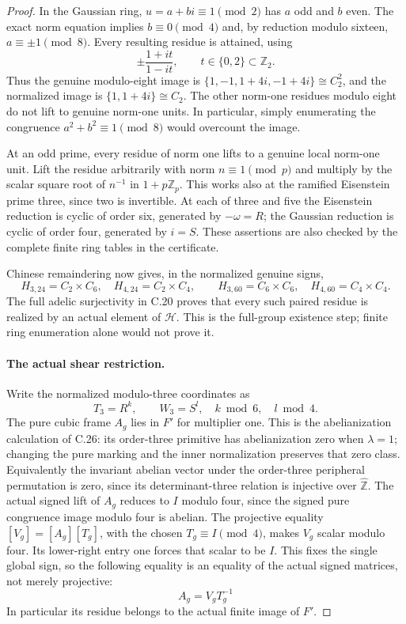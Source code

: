 \begin{proof}
In the Gaussian ring, $u=a+bi\equiv1\pmod2$ has $a$ odd and
$b$ even. The exact norm equation implies $b\equiv0\pmod4$ and,
by reduction modulo sixteen, $a\equiv\pm1\pmod8$.
Every resulting residue is attained, using
\[
 \pm\frac{1+it}{1-it},\qquad t\in\{0,2\}\subset\mathbb Z_2.
                                                               \tag{C.49.6}
\]
Thus the genuine modulo-eight image is
$\{1,-1,1+4i,-1+4i\}\cong C_2^2$, and the normalized image is
$\{1,1+4i\}\cong C_2$.
The other norm-one residues modulo eight do not lift to genuine
norm-one units. In particular, simply enumerating the congruence
$a^2+b^2\equiv1\pmod8$ would overcount the image.

At an odd prime, every residue of norm one lifts to a genuine local
norm-one unit. Lift the residue arbitrarily with norm $n\equiv1\pmod p$
and multiply by the scalar square root of $n^{-1}$ in $1+p\mathbb Z_p$.
This works also at the ramified Eisenstein prime three, since two
is invertible. At each of three and five the Eisenstein reduction
is cyclic of order six, generated by $-\omega=R$; the Gaussian
reduction is cyclic of order four, generated by $i=S$.
These assertions are also checked by the complete finite ring tables
in the certificate.

Chinese remaindering now gives, in the normalized genuine signs,
\[
 H_{3,24}=C_2\times C_6,\quad H_{4,24}=C_2\times C_4,
 \qquad H_{3,60}=C_6\times C_6,\quad H_{4,60}=C_4\times C_4.
                                                               \tag{C.49.7}
\]
The full adelic surjectivity in C.20 proves that every such paired
residue is realized by an actual element of $\mathcal H$.
This is the full-group existence step; finite ring enumeration
alone would not prove it.

\paragraph{The actual shear restriction.}
Write the normalized modulo-three coordinates as
\[
                       T_3=R^k,\qquad W_3=S^l,
                 \quad k\bmod6,\quad l\bmod4.          \tag{C.49.8}
\]
The pure cubic frame $A_g$ lies in $F'$ for multiplier one.
This is the abelianization calculation of C.26: its order-three
primitive has abelianization zero when $\lambda=1$; changing the
pure marking and the inner normalization preserves that zero class.
Equivalently the invariant abelian vector under the order-three
peripheral permutation is zero, since its determinant-three
relation is injective over $\widehat{\mathbb Z}$.
The actual signed lift of $A_g$ reduces to $I$ modulo four,
since the signed pure congruence image modulo four is abelian.
The projective equality $[V_g]=[A_g][T_g]$, with the chosen
$T_g\equiv I\pmod4$, makes $V_g$ scalar modulo four.
Its lower-right entry one forces that scalar to be $I$.
This fixes the single global sign, so the following equality is
an equality of the actual signed matrices, not merely projective:
\[
                              A_g=V_g T_g^{-1}          \tag{C.49.9}
\]
In particular its residue belongs to the actual finite image of $F'$.


\end{proof}
